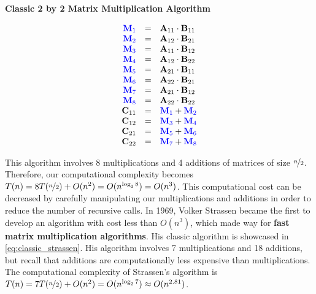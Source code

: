     \begin{center}
        \textbf{Classic 2 by 2 Matrix Multiplication Algorithm}
        \vspace{-20pt}
    \end{center}
    \begin{equation}
        \begin{array}{rcl}
            \color{blue} \mathbf{M}_1 & = & \mathbf{A}_{11}\cdot \mathbf{B}_{11} \\
            \color{blue} \mathbf{M}_2 & = & \mathbf{A}_{12}\cdot \mathbf{B}_{21} \\
            \color{blue} \mathbf{M}_3 & = & \mathbf{A}_{11}\cdot \mathbf{B}_{12} \\
            \color{blue} \mathbf{M}_4 & = & \mathbf{A}_{12}\cdot \mathbf{B}_{22} \\
            \color{blue} \mathbf{M}_5 & = & \mathbf{A}_{21}\cdot \mathbf{B}_{11} \\
            \color{blue} \mathbf{M}_6 & = & \mathbf{A}_{22}\cdot \mathbf{B}_{21} \\
            \color{blue} \mathbf{M}_7 & = & \mathbf{A}_{21}\cdot \mathbf{B}_{12} \\
            \color{blue} \mathbf{M}_8 & = & \mathbf{A}_{22}\cdot \mathbf{B}_{22} \\
            \mathbf{C}_{11} & = & \color{blue} \mathbf{M}_1 \color{black} + \color{blue} \mathbf{M}_2 \\
            \mathbf{C}_{12} & = & \color{blue} \mathbf{M}_3 \color{black} + \color{blue} \mathbf{M}_4 \\
            \mathbf{C}_{21} & = & \color{blue} \mathbf{M}_5 \color{black} + \color{blue} \mathbf{M}_6 \\
            \mathbf{C}_{22} & = & \color{blue} \mathbf{M}_7 \color{black} + \color{blue} \mathbf{M}_8
        \end{array}
        \label{eq:classic_matmul}
    \end{equation}


    This algorithm involves 8 multiplications and 4 additions of matrices of size
    $\nicefrac n2$. Therefore, our computational complexity becomes $T(n) =
    8T(\nicefrac{n}{2}) + O(n^2) = O(n^{\log_2 8}) = O(n^3)$. This computational
    cost can be decreased by carefully manipulating our multiplications and additions
    in order to reduce the number of recursive calls. In 1969, Volker Strassen
    became the first to develop an algorithm with cost less than $O(n^3)$, which
    made way for \textbf{fast matrix multiplication algorithms}. His classic
    algorithm is showcased in \ref{eq:classic_strassen}. His algorithm involves 7
    multiplications and 18 additions, but recall that additions are computationally
    less expensive than multiplications. The computational complexity of Strassen's
    algorithm is $T(n) = 7T(\nicefrac n2) + O(n^2) = O(n^{\log_2 7}) \approx O(n^{2.81})$. 

